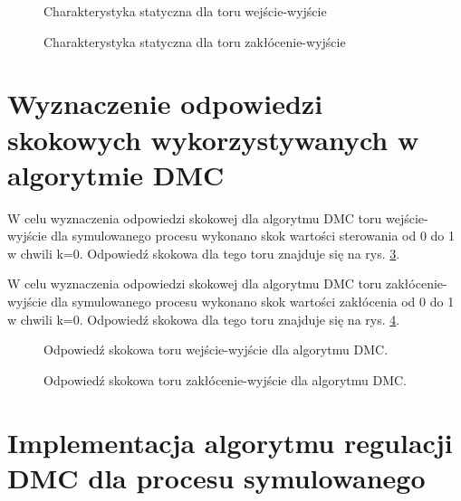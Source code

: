 \documentclass[a4paper,titlepage,11pt,twosides,floatssmall]{mwrep}
\begin{document}
\begin{figure}[H]
	\centering
	
	\caption{Charakterystyka statyczna dla toru wejście-wyjście}
	\label{char_stat_wej}
\end{figure}

\begin{figure}[H]
	\centering
	
	\caption{Charakterystyka statyczna dla toru zakłócenie-wyjście}
	\label{char_stat_zak}
\end{figure}




\section{Wyznaczenie odpowiedzi skokowych wykorzystywanych w algorytmie DMC}

W celu wyznaczenia odpowiedzi skokowej dla algorytmu DMC toru wejście-wyjście dla symulowanego procesu wykonano skok wartości sterowania od 0 do 1 w chwili k=0. Odpowiedź skokowa dla tego toru znajduje się na rys. \ref{skok_DMC_ster}.

W celu wyznaczenia odpowiedzi skokowej dla algorytmu DMC toru zakłócenie-wyjście dla symulowanego procesu wykonano skok wartości zakłócenia od 0 do 1 w chwili k=0. Odpowiedź skokowa dla tego toru znajduje się na rys. \ref{skok_DMC_zak}.

\begin{figure}[H]
	\centering
	
	\caption{Odpowiedź skokowa toru wejście-wyjście dla algorytmu DMC.}
	\label{skok_DMC_ster}
\end{figure}


\begin{figure}[H]
	\centering
	
	\caption{Odpowiedź skokowa toru zakłócenie-wyjście dla algorytmu DMC.}
	\label{skok_DMC_zak}
\end{figure}

\section{Implementacja algorytmu regulacji DMC dla procesu symulowanego}
\end{document}
